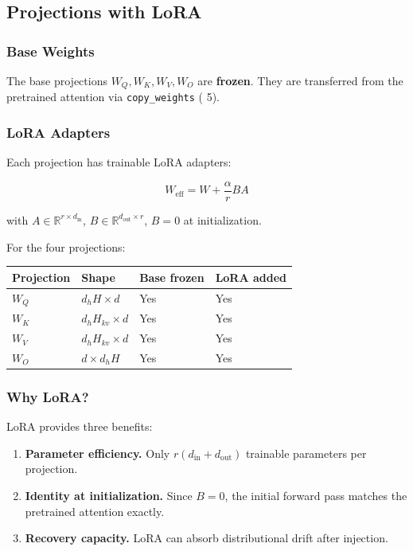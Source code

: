 \subsection{Projections with LoRA}

\subsubsection{Base Weights}

The base projections $W_Q, W_K, W_V, W_O$ are \textbf{frozen}. They are 
transferred from the pretrained attention via \texttt{copy\_weights} ( 5).

\subsubsection{LoRA Adapters}

Each projection has trainable LoRA adapters:

\[
W_\text{eff} = W + \frac{\alpha}{r} B A
\tag{4.1}
\]

with $A \in \mathbb{R}^{r \times d_\text{in}}$, $B \in \mathbb{R}^{d_\text{out} \times r}$, 
$B = 0$ at initialization.

For the four projections:

\begin{table}[H]
\centering
\small
\begin{tabular}{llll}
\toprule
\textbf{Projection} & \textbf{Shape} & \textbf{Base frozen} & \textbf{LoRA added} \\
\midrule
$W_Q$ & $d_h H \times d$ & Yes & Yes \\
$W_K$ & $d_h H_{kv} \times d$ & Yes & Yes \\
$W_V$ & $d_h H_{kv} \times d$ & Yes & Yes \\
$W_O$ & $d \times d_h H$ & Yes & Yes \\
\bottomrule
\end{tabular}
\end{table}

\subsubsection{Why LoRA?}

LoRA provides three benefits:

\begin{enumerate}
\item \textbf{Parameter efficiency.} Only $r(d_\text{in} + d_\text{out})$ trainable
  parameters per projection.
\item \textbf{Identity at initialization.} Since $B = 0$, the initial forward pass
  matches the pretrained attention exactly.
\item \textbf{Recovery capacity.} LoRA can absorb distributional drift after
  injection.

\end{enumerate}
